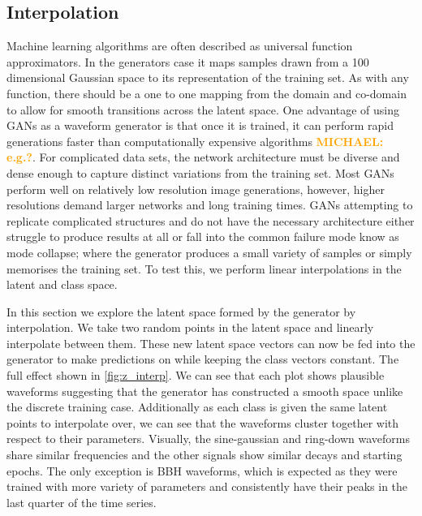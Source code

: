 \documentclass[12pt]{iopart}
\newcommand{\michael}[1]{\textbf{\textcolor{orange}{MICHAEL: #1}}}
\begin{document}
\subsection{Interpolation}
Machine learning algorithms are often described as universal function approximators. In the generators case it maps samples drawn from a 100 dimensional Gaussian space to its representation of the training set. As with any function, there should be a one to one mapping from the domain and co-domain to allow for smooth transitions across the latent space. One advantage of using GANs as a waveform generator is that once it is trained, it can perform rapid generations faster than computationally
expensive algorithms \michael{e.g.?}. For complicated data sets, the network architecture must be diverse and dense enough to capture distinct variations from the training set. Most GANs perform well on relatively low resolution image generations, however, higher resolutions demand larger networks and long training times. GANs attempting to replicate complicated structures and do not have the necessary architecture either struggle to produce results at all or fall into the common failure mode know as mode collapse; where the generator produces a small variety of samples or simply memorises the training set. To test this, we perform linear interpolations in the latent and class space. 

In this section we explore the latent space formed by the generator by interpolation. We take two random points in the latent space and linearly interpolate between them. These new latent space vectors can now be fed into the generator to make predictions on while keeping the class vectors constant. The full effect shown in \cref{fig:z_interp}. We can see that each plot shows plausible waveforms suggesting that the generator has constructed a smooth space unlike the discrete training case. Additionally as each class is given the same latent points to interpolate over, we can see that the waveforms cluster together with respect to their parameters. Visually, the sine-gaussian and ring-down waveforms share similar frequencies and the other signals show similar decays and starting epochs. The only exception is BBH waveforms, which is expected as they were trained with more variety of parameters and consistently have their peaks in the last quarter of the time series.
\end{document}
